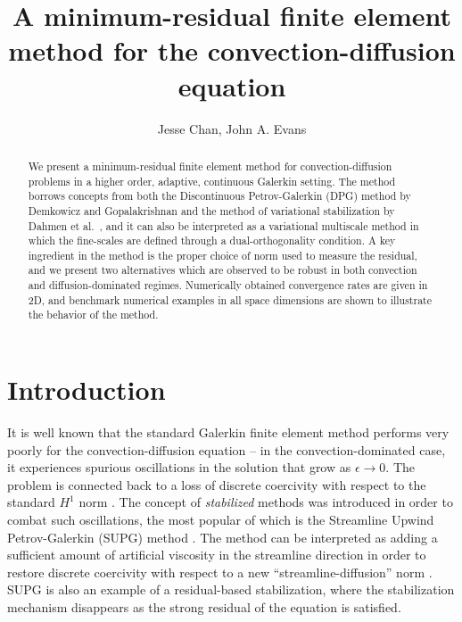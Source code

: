 \documentclass[final,leqno]{siamltex}
\title{A minimum-residual finite element method for the convection-diffusion equation}
\author{Jesse Chan, John A. Evans}
\date{}
\begin{document}
\maketitle

\begin{abstract}
We present a minimum-residual finite element method for convection-diffusion problems in a higher order, adaptive, continuous Galerkin setting.  The method borrows concepts from both the Discontinuous Petrov-Galerkin (DPG) method by Demkowicz and Gopalakrishnan \cite{DPG2} and the method of variational stabilization by Dahmen et al.\ \cite{DahmenVariationalStabilization}, and it can also be interpreted as a variational multiscale method in which the fine-scales are defined through a dual-orthogonality condition.  A key ingredient in the method is the proper choice of norm used to measure the residual, and we present two alternatives which are observed to be robust in both convection and diffusion-dominated regimes.  Numerically obtained convergence rates are given in 2D, and benchmark numerical examples in all space dimensions are shown to illustrate the behavior of the method.
\end{abstract}


\section{Introduction}

It is well known that the standard Galerkin finite element method performs very poorly for the convection-diffusion equation -- in the convection-dominated case, it experiences spurious oscillations in the solution that grow as $\epsilon \rightarrow 0$.  The problem is connected back to a loss of discrete coercivity with respect to the standard $H^1$ norm \cite{roos2008robust}.  The concept of \textit{stabilized} methods was introduced in order to combat such oscillations, the most popular of which is the Streamline Upwind Petrov-Galerkin (SUPG) method \cite{SUPG}.  The method can be interpreted as adding a sufficient amount of artificial viscosity in the streamline direction in order to restore discrete coercivity with respect to a new ``streamline-diffusion'' norm \cite{johnsonCrosswind}.  SUPG is also an example of a residual-based stabilization, where the stabilization mechanism disappears as the strong residual of the equation is satisfied.  
\end{document}
